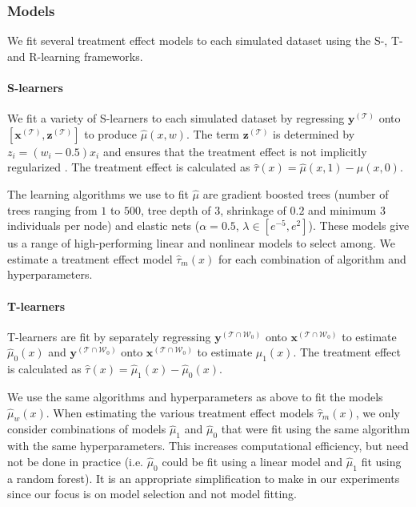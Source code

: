 \subsubsection{Models}

We fit several treatment effect models to each simulated dataset using the S-, T- and R-learning frameworks.

\paragraph{S-learners} We fit a variety of S-learners to each simulated dataset by regressing $\bm y^{(\mathcal T)}$ onto $[\bm x^{(\mathcal T)}, \bm z^{(\mathcal T)}]$ to produce $\hat\mu(x,w)$. The term $\bm z^{(\mathcal T)}$ is determined by $z_i = ( w_i- 0.5) x_i$ and ensures that the treatment effect is not implicitly regularized \cite{Nie:2017vi}. The treatment effect is calculated as $\hat\tau(x) = \hat\mu(x,1) - \hat\mu(x,0)$. 

The learning algorithms we use to fit $\hat\mu$ are gradient boosted trees (number of trees ranging from $1$ to $500$, tree depth of $3$, shrinkage of $0.2$ and minimum $3$ individuals per node) and elastic nets ($\alpha=0.5$, $\lambda \in [e^{-5}, e^2]$). These models give us a range of high-performing linear and nonlinear models to select among. We estimate a treatment effect model $\hat\tau_m(x)$ for each combination of algorithm and hyperparameters.

\paragraph{T-learners} T-learners are fit by separately regressing $\bm y^{(\mathcal T \cap \mathcal W_0)}$ onto $\bm x^{(\mathcal T \cap \mathcal W_0)}$ to estimate $\hat\mu_0(x)$ and $\bm y^{(\mathcal T \cap \mathcal W_0)}$ onto $\bm x^{(\mathcal T \cap \mathcal W_0)}$ to estimate $\hat\mu_1(x)$. The treatment effect is calculated as $\hat\tau(x) = \hat\mu_1(x) - \hat\mu_0(x)$. 

We use the same algorithms and hyperparameters as above to fit the models $\hat\mu_w(x)$. When estimating the various treatment effect models $\hat\tau_m(x)$, we only consider combinations of models $\hat\mu_1$ and $\hat\mu_0$ that were fit using the same algorithm with the same hyperparameters. This increases computational efficiency, but need not be done in practice (i.e. $\hat\mu_0$ could be fit using a linear model and $\hat\mu_1$ fit using a random forest). It is an appropriate simplification to make in our experiments since our focus is on model selection and not model fitting.

